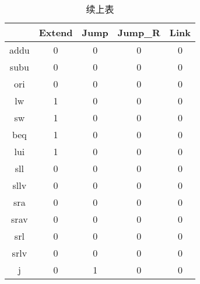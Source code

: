 \documentclass[UTF8]{ctexart}
\begin{document}
\begin{table}[H]
	\centering
	\begin{threeparttable}
		\caption{续上表}
		\begin{tabular}{|c|c|c|c|c|}
			\hline
			\rowcolor{mypink}
			\diagbox{\textbf{Inst}}{\textbf{Output}} & \textbf{Extend} & \textbf{Jump} & \textbf{Jump\_R} & \textbf{Link} \\
			\hline
			addu                                     & 0               & 0             & 0                & 0             \\
			\hline
			subu                                     & 0               & 0             & 0                & 0             \\
			\hline
			ori                                      & 0               & 0             & 0                & 0             \\
			\hline
			lw                                       & 1               & 0             & 0                & 0             \\
			\hline
			sw                                       & 1               & 0             & 0                & 0             \\
			\hline
			beq                                      & 1               & 0             & 0                & 0             \\
			\hline
			lui                                      & 1               & 0             & 0                & 0             \\
			\hline
			sll                                      & 0               & 0             & 0                & 0             \\
			\hline
			sllv                                     & 0               & 0             & 0                & 0             \\
			\hline
			sra                                      & 0               & 0             & 0                & 0             \\
			\hline
			srav                                     & 0               & 0             & 0                & 0             \\
			\hline
			srl                                      & 0               & 0             & 0                & 0             \\
			\hline
			srlv                                     & 0               & 0             & 0                & 0             \\
			\hline
			j                                        & 0               & 1             & 0                & 0             \\

\end{tabular}
\end{threeparttable}
\end{table}
\end{document}
